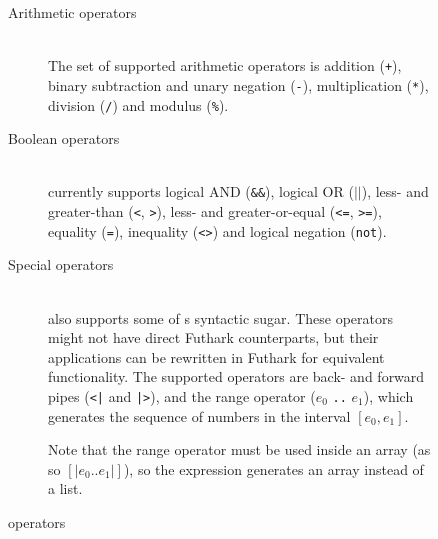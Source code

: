 \begin{figure}[h]
  \centering
\begin{description}
\item[Arithmetic operators]\hfill\\
  The set of supported arithmetic operators is addition (\texttt{+}),
  binary subtraction and unary negation (\texttt{-}), multiplication
  (\texttt{*}), division (\texttt{/}) and modulus (\texttt{\%}).

\item[Boolean operators]\hfill\\
  \fshark{} currently supports logical AND (\texttt{\&\&}), logical OR
  (\texttt{$||$}), less- and greater-than (\texttt{<}, \texttt{>}), less- and
  greater-or-equal (\texttt{<=}, \texttt{>=}), equality (\texttt{=}),
  inequality (\texttt{<>}) and logical negation (\texttt{not}).

\item[Special operators]\hfill\\
  \fshark{} also supports some of \fsharp{}s syntactic sugar. These operators
  might not have direct Futhark counterparts, but their applications can be
  rewritten in Futhark for equivalent functionality.
  The supported operators are back- and forward pipes (\texttt{<|} and
  \texttt{|>}), and the range operator ($e_0$ \texttt{..} $e_1$), which
  generates the sequence of numbers in the interval $[e_0,e_1]$.

  Note that the range operator must be used inside an array (as so
  \texttt{$[\vert e_0..e_1\vert]$}), so the expression generates an array
  instead of a list.
\end{description}
  \caption{\fshark{} operators}
\label{fig:fsharkops}
\end{figure}



